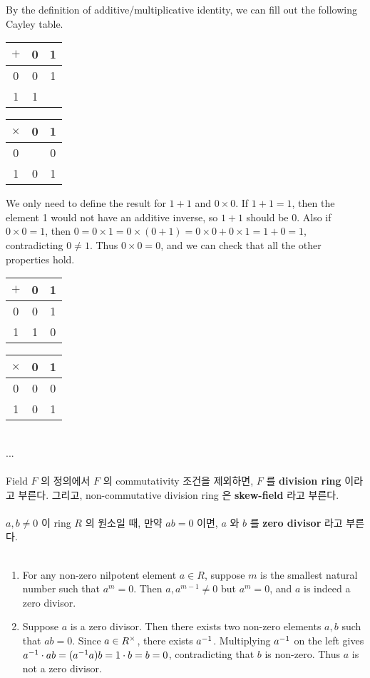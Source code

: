  By the definition of additive/multiplicative identity, we can fill out the following Cayley table.
\begin{center}
	\begin{tabular}{c|cc}
		$+$ & 0 & 1 \\ \hline
		0 & 0 & 1\\
		1 & 1 & \\
	\end{tabular} \qquad
	\begin{tabular}{c|cc}
		$\times$ & 0 & 1 \\ \hline
		0 & & 0\\
		1 & 0 & 1\\
	\end{tabular}
\end{center}
We only need to define the result for $1+1$ and $0 \times 0$. If $1+1=1$, then the element 1 would not have an additive inverse, so $1+1$ should be 0. Also if $0\times 0 = 1$, then $0 = 0 \times 1 = 0\times(0+1) = 0\times 0 + 0\times 1 = 1 + 0 = 1$, contradicting $0\neq 1$. Thus $0\times 0 = 0$, and we can check that all the other properties hold.
\begin{center}
	\begin{tabular}{c|cc}
		$+$ & 0 & 1 \\ \hline
		0 & 0 & 1\\
		1 & 1 & 0\\
	\end{tabular} \qquad
	\begin{tabular}{c|cc}
		$\times$ & 0 & 1 \\ \hline
		0 & 0 & 0\\
		1 & 0 & 1\\
	\end{tabular}
\end{center}~
\\
 ...\\
\\
 Field $F$ 의 정의에서 $F$ 의 commutativity 조건을 제외하면, $F$ 를 \textbf{division ring} 이라고 부른다. 그리고, non-commutative division ring 은 \textbf{skew-field} 라고 부른다.\\
\\
 $a, b\neq 0$ 이 ring $R$ 의 원소일 때, 만약 $ab=0$ 이면, $a$ 와 $b$ 를 \textbf{zero divisor} 라고 부른다.\\
\\
\begin{enumerate}
	\item For any non-zero nilpotent element $a \in R$, suppose $m$ is the smallest natural number such that $a^m = 0$. Then $a, a^{m-1}\neq 0$ but $a^m = 0$, and $a$ is indeed a zero divisor.
	\item Suppose $a$ is a zero divisor. Then there exists two non-zero elements $a, b$ such that $ab = 0$. Since $a\in R^\times$, there exists $a^{-1}$. Multiplying $a^{-1}$ on the left gives $a^{-1}\cdot ab = (a^{-1} a)b = 1\cdot b = b = 0$, contradicting that $b$ is non-zero. Thus $a$ is not a zero divisor.
\end{enumerate}~

